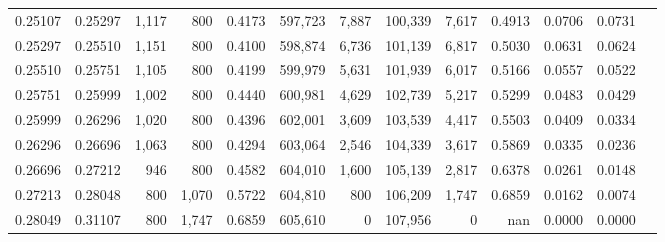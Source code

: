 \begin{tabular}{rrrrrrrrrrrrr}
0.25107 & 0.25297 &  1,117 &   800 &                                     0.4173 & 597,723 &   7,887 & 100,339 &   7,617 & 0.4913 & 0.0706 & 0.0731 \\
0.25297 & 0.25510 &  1,151 &   800 &                                     0.4100 & 598,874 &   6,736 & 101,139 &   6,817 & 0.5030 & 0.0631 & 0.0624 \\
0.25510 & 0.25751 &  1,105 &   800 &                                     0.4199 & 599,979 &   5,631 & 101,939 &   6,017 & 0.5166 & 0.0557 & 0.0522 \\
0.25751 & 0.25999 &  1,002 &   800 &                                     0.4440 & 600,981 &   4,629 & 102,739 &   5,217 & 0.5299 & 0.0483 & 0.0429 \\
0.25999 & 0.26296 &  1,020 &   800 &                                     0.4396 & 602,001 &   3,609 & 103,539 &   4,417 & 0.5503 & 0.0409 & 0.0334 \\
0.26296 & 0.26696 &  1,063 &   800 &                                     0.4294 & 603,064 &   2,546 & 104,339 &   3,617 & 0.5869 & 0.0335 & 0.0236 \\
0.26696 & 0.27212 &    946 &   800 &                                     0.4582 & 604,010 &   1,600 & 105,139 &   2,817 & 0.6378 & 0.0261 & 0.0148 \\
0.27213 & 0.28048 &    800 & 1,070 &                                     0.5722 & 604,810 &     800 & 106,209 &   1,747 & 0.6859 & 0.0162 & 0.0074 \\
0.28049 & 0.31107 &    800 & 1,747 &                                     0.6859 & 605,610 &       0 & 107,956 &       0 &    nan & 0.0000 & 0.0000 \\
\bottomrule
\end{tabular}
